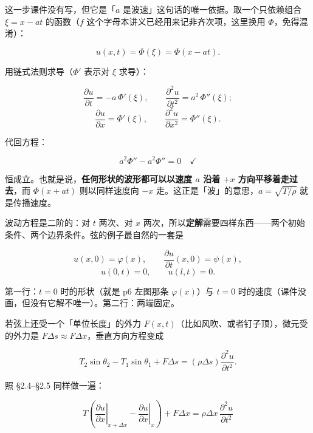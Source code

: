 \documentclass[11pt]{ctexart}
\let\origsubhdr\subhdr
\renewcommand{\subhdr}[1]{\par\needspace{3\baselineskip}\origsubhdr{#1}}
\let\orighdr\hdr
\renewcommand{\hdr}[2]{\par\needspace{6\baselineskip}\orighdr{#1}{#2}}
\begin{document}

这一步课件没有写，但它是「$a$ 是波速」这句话的唯一依据。取一个只依赖组合 $\xi=x-at$ 的函数（$f$ 这个字母本讲义已经用来记非齐次项，这里换用 $\Phi$，免得混淆）：

\[
u(x,t)=\Phi(\xi)=\Phi(x-at).
\]

用链式法则求导（$\Phi'$ 表示对 $\xi$ 求导）：

\[
\frac{\partial u}{\partial t}=-a\,\Phi'(\xi),\qquad
\frac{\partial^2u}{\partial t^2}=a^2\,\Phi''(\xi);
\]
\[
\frac{\partial u}{\partial x}=\Phi'(\xi),\qquad
\frac{\partial^2u}{\partial x^2}=\Phi''(\xi).
\]

代回方程：

\[
a^2\Phi''-a^2\Phi''=0\quad\checkmark
\]

恒成立。也就是说，\textbf{任何形状的波形都可以以速度 $a$ 沿着 $+x$ 方向平移着走过去}，而 $\Phi(x+at)$ 则以同样速度向 $-x$ 走。这正是「波」的意思，$a=\sqrt{T/\rho}$ 就是传播速度。


波动方程是二阶的：对 $t$ 两次、对 $x$ 两次，所以\textbf{定解}需要四样东西——两个初始条件、两个边界条件。弦的例子最自然的一套是

\[
u(x,0)=\varphi(x),\qquad \frac{\partial u}{\partial t}(x,0)=\psi(x),
\]
\[
u(0,t)=0,\qquad u(l,t)=0 .
\]

第一行：$t=0$ 时的形状（就是 p6 左图那条 $\varphi(x)$）与 $t=0$ 时的速度（课件没画，但没有它解不唯一）。第二行：两端固定。




若弦上还受一个「单位长度」的外力 $F(x,t)$（比如风吹、或者钉子顶），微元受的外力是 $F\Delta s\approx F\Delta x$，垂直方向方程变成

\[
T_2\sin\theta_2-T_1\sin\theta_1+F\Delta s=(\rho\Delta s)\frac{\partial^2u}{\partial t^2}.
\]

照 §2.4--§2.5 同样做一遍：

\[
T\left(\left.\frac{\partial u}{\partial x}\right|_{x+\Delta x}-\left.\frac{\partial u}{\partial x}\right|_{x}\right)+F\Delta x
=\rho\Delta x\,\frac{\partial^2u}{\partial t^2}
\]
\end{document}
